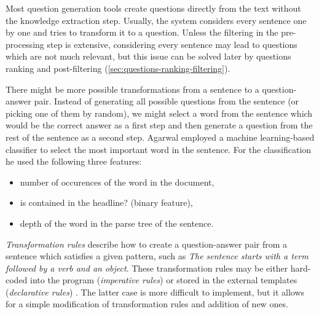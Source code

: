 \documentclass[a4paper, 12pt, twoside]{fithesis2}		%
\renewcommand{\_}{\leavevmode \kern0.07em\vbox{\hrule width0.4em}}
\newcommand{\squarebullet}{\textcolor{black}{\raisebox{0.15em}{\rule{4pt}{4pt}}}}
\newcommand{\emptysquarebullet}{\textcolor{black}{\raisebox{0.10em}{\tiny$\square$}}}
\newenvironment{myItemize}{
  \begin{itemize}[leftmargin=2em,rightmargin=1em,itemsep=\parskip ,parsep=0em,topsep=0em,partopsep=0em]
  \renewcommand{\labelitemi}{\squarebullet}
  \renewcommand{\labelitemii}{\textbullet}
}{
  \end{itemize}
}
\begin{document}
Most question generation tools create questions directly from the text without the knowledge extraction step.
Usually, the system considers every sentence one by one
and tries to transform it to a question.
Unless the filtering in the pre-processing step is extensive,
considering every sentence may lead to questions which are not much relevant,
but this issue can be solved later by questions ranking and post-filtering
(\autoref{sec:questions-ranking-filtering}).

There might be more possible transformations from a sentence to a question-answer pair.
Instead of generating all possible questions from the sentence (or picking one of them by random),
we might select a word from the sentence which would be the correct answer as a first step and then generate a question from the rest of the sentence as a second step.
Agarwal \cite{question-gen-textbooks} employed a machine learning-based classifier to select the most important word in the sentence. For the classification he used the following three features:
\begin{myItemize}
\item number of occurences of the word in the document,
\item is contained in the headline? (binary feature),
\item depth of the word in the parse tree of the sentence.
\end{myItemize}

\textit{Transformation rules} describe how to create a question-answer pair from a sentence
which satisfies a given pattern,
such as \textit{The sentence starts with a term followed by a verb and an object}.
These transformation rules may be either hard-coded into the program (\textit{imperative rules})
\cite{questions-wolfe, question-overgenerating-rating, question-gen-connectives}
or stored in the external templates (\textit{declarative rules})
\cite{question-gen-ceist, questions-eval}.
The latter case is more difficult to implement, but it allows for a simple modification of transformation rules and addition of new ones.
\end{document}
